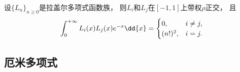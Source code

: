 \begin{property}
设\(\{L_n\}_{n\geq0}\)是拉盖尔多项式函数族，
则\(L_i\)和\(L_j\)在\([-1,1]\)上带权\(\rho\)正交，
且\begin{equation}
	\def\arraystretch{1.5}
	\int_0^{+\infty} L_i(x) L_j(x) e^{-x} \dd{x}
	= \begin{cases}
		0, & i \neq j, \\
		(n!)^2, & i = j.
	\end{cases}
\end{equation}
\end{property}

\subsection{厄米多项式}
